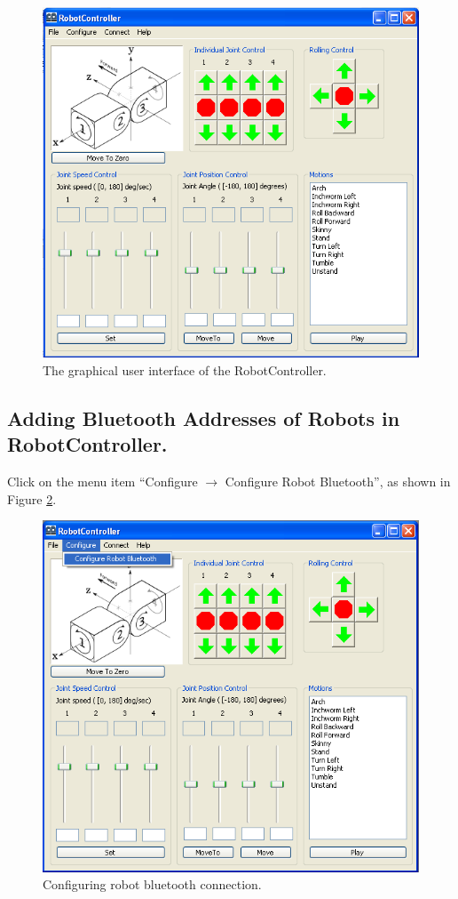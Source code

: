 \documentclass{article}
\begin{document}
\begin{figure}[H]
\begin{center}
\includegraphics[width=4.5in]{images/shot1.png}
\end{center}
\caption{\label{fig:shot1.png} The graphical user interface of the RobotController.}
\end{figure}

\subsection{Adding Bluetooth Addresses of Robots in RobotController.}
Click on the menu item ``Configure $\rightarrow$ Configure Robot Bluetooth'', as
shown in Figure \ref{fig:shot3.png}.

\begin{figure}[H]
\begin{center}
\includegraphics[width=4.5in]{images/shot3.png}
\end{center}
\caption{\label{fig:shot3.png} Configuring robot bluetooth connection.}
\end{figure}
\end{document}
